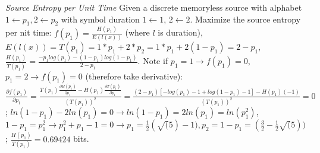 \documentclass[10pt]{article}
\begin{document}
\begin{tiny}
\begin{multicols}{3}
\textit{Source Entropy per Unit Time} 
Given a discrete memoryless source with alphabet $1 \gets p_1, 2 \gets p_2$ with symbol duration $1 \gets 1$, $2 \gets 2$. 
Maximize the source entropy per nit time: $f(p_1) = \frac{H(p_1)}{E(l(x))}$ (where $l$ is duration), $E(l(x)) = T(p_1) = 1*p_1 + 2*p_2 = 1*p_1 + 2(1-p_1) = 2 - p_1$, $\frac{H(p_1)}{T(p_1)} = \frac{-p_1 log(p_1) - (1-p_1)log(1-p_1)}{2-p_1}$. Note if $p_1 = 1 \to f(p_1) = 0$, $p_1 = 2 \to f(p_1) = 0$ 
(therefore take derivative): $\frac{\partial f(p_1)}{\partial p_1} = \frac{ T(p_1)\frac{\partial H(p_1)}{\partial p_1} - H(p_1)\frac{\partial T(p_1)}{\partial p_1}}{(T(p_1))^2} = \frac{(2-p_1)[-log(p_1) -1 + log(1-p_1) - 1] - H(p_1)(-1)}{(T(p_1))^2}=0$; $ln(1-p_1) - 2ln(p_1) = 0 \to ln(1-p_1) = 2ln(p_1) = ln(p_1^2)$, $1-p_1 = p_1^2 \to p_1^2 + p_1 - 1 = 0 \to p_1 = \frac{1}{2}(\sqrt(5) - 1), p_2 = 1 - p_1 = (\frac{3}{2} - \frac{1}{2}\sqrt(5))$; $\frac{H(p_1)}{T(p_1)} = 0.69424$ bits. 


\end{multicols}
\end{tiny}
\end{document}
